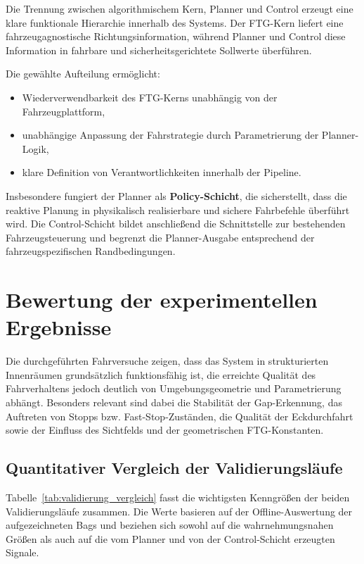 Die Trennung zwischen algorithmischem Kern, Planner und Control erzeugt eine klare funktionale Hierarchie innerhalb des Systems. Der FTG-Kern liefert eine fahrzeugagnostische Richtungsinformation, während Planner und Control diese Information in fahrbare und sicherheitsgerichtete Sollwerte überführen.

Die gewählte Aufteilung ermöglicht:

\begin{itemize}
    \item Wiederverwendbarkeit des FTG-Kerns unabhängig von der Fahrzeugplattform,
    \item unabhängige Anpassung der Fahrstrategie durch Parametrierung der Planner-Logik,
    \item klare Definition von Verantwortlichkeiten innerhalb der Pipeline.
\end{itemize}

Insbesondere fungiert der Planner als \textbf{Policy-Schicht}, die sicherstellt, dass die reaktive Planung in physikalisch realisierbare und sichere Fahrbefehle überführt wird. Die Control-Schicht bildet anschließend die Schnittstelle zur bestehenden Fahrzeugsteuerung und begrenzt die Planner-Ausgabe entsprechend der fahrzeugspezifischen Randbedingungen.

\section{Bewertung der experimentellen Ergebnisse}

Die durchgeführten Fahrversuche zeigen, dass das System in strukturierten Innenräumen grundsätzlich funktionsfähig ist, die erreichte Qualität des Fahrverhaltens jedoch deutlich von Umgebungsgeometrie und Parametrierung abhängt. Besonders relevant sind dabei die Stabilität der Gap-Erkennung, das Auftreten von Stopps bzw. Fast-Stop-Zuständen, die Qualität der Eckdurchfahrt sowie der Einfluss des Sichtfelds und der geometrischen FTG-Konstanten.

\subsection{Quantitativer Vergleich der Validierungsläufe}

Tabelle~\ref{tab:validierung_vergleich} fasst die wichtigsten Kenngrößen der beiden Validierungsläufe zusammen. Die Werte basieren auf der Offline-Auswertung der aufgezeichneten Bags und beziehen sich sowohl auf die wahrnehmungsnahen Größen als auch auf die vom Planner und von der Control-Schicht erzeugten Signale.

